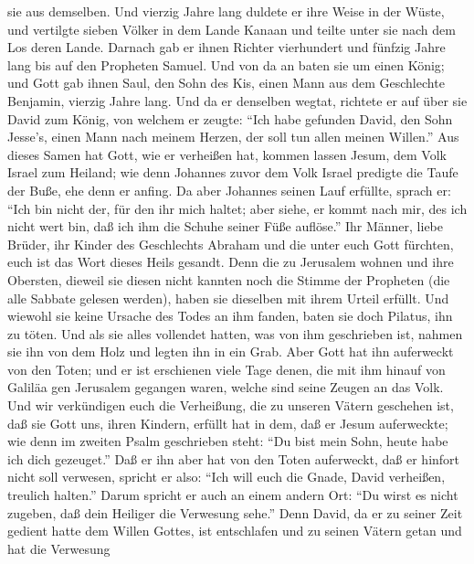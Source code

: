 sie aus demselben.  Und vierzig Jahre lang duldete er ihre
Weise in der Wüste,  und vertilgte sieben Völker in dem
Lande Kanaan und teilte unter sie nach dem Los deren Lande.
 Darnach gab er ihnen Richter vierhundert und fünfzig Jahre
lang bis auf den Propheten Samuel.  Und von da an baten sie
um einen König; und Gott gab ihnen Saul, den Sohn des Kis, einen Mann
aus dem Geschlechte Benjamin, vierzig Jahre lang.  Und da
er denselben wegtat, richtete er auf über sie David zum König, von
welchem er zeugte: ``Ich habe gefunden David, den Sohn Jesse's, einen
Mann nach meinem Herzen, der soll tun allen meinen Willen.''
 Aus dieses Samen hat Gott, wie er verheißen hat, kommen
lassen Jesum, dem Volk Israel zum Heiland;  wie denn
Johannes zuvor dem Volk Israel predigte die Taufe der Buße, ehe denn er
anfing.  Da aber Johannes seinen Lauf erfüllte, sprach er:
``Ich bin nicht der, für den ihr mich haltet; aber siehe, er kommt nach
mir, des ich nicht wert bin, daß ich ihm die Schuhe seiner Füße
auflöse.''  Ihr Männer, liebe Brüder, ihr Kinder des
Geschlechts Abraham und die unter euch Gott fürchten, euch ist das Wort
dieses Heils gesandt.  Denn die zu Jerusalem wohnen und
ihre Obersten, dieweil sie diesen nicht kannten noch die Stimme der
Propheten (die alle Sabbate gelesen werden), haben sie dieselben mit
ihrem Urteil erfüllt.  Und wiewohl sie keine Ursache des
Todes an ihm fanden, baten sie doch Pilatus, ihn zu töten. 
Und als sie alles vollendet hatten, was von ihm geschrieben ist, nahmen
sie ihn von dem Holz und legten ihn in ein Grab.  Aber Gott
hat ihn auferweckt von den Toten;  und er ist erschienen
viele Tage denen, die mit ihm hinauf von Galiläa gen Jerusalem gegangen
waren, welche sind seine Zeugen an das Volk.  Und wir
verkündigen euch die Verheißung, die zu unseren Vätern geschehen ist,
 daß sie Gott uns, ihren Kindern, erfüllt hat in dem, daß
er Jesum auferweckte; wie denn im zweiten Psalm geschrieben steht: ``Du
bist mein Sohn, heute habe ich dich gezeuget.''  Daß er ihn
aber hat von den Toten auferweckt, daß er hinfort nicht soll verwesen,
spricht er also: ``Ich will euch die Gnade, David verheißen, treulich
halten.''  Darum spricht er auch an einem andern Ort: ``Du
wirst es nicht zugeben, daß dein Heiliger die Verwesung sehe.''
 Denn David, da er zu seiner Zeit gedient hatte dem Willen
Gottes, ist entschlafen und zu seinen Vätern getan und hat die Verwesung
